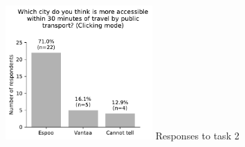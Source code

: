 \begin{appendices}
\begin{figure}[H]
	\includegraphics[width=0.5\textwidth]{visual/figures/survey/2.pdf}
	\newline
	Responses to task 2
\end{figure}


\end{appendices}
